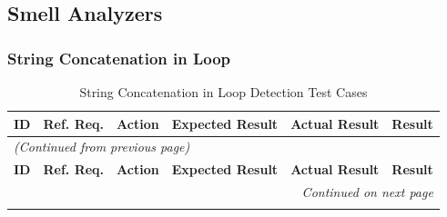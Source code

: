 \documentclass[12pt, titlepage]{article}
\begin{document}
\subsection{Smell Analyzers}

\subsubsection{String Concatenation in Loop}

\begin{longtable}{c 
  >{\raggedright\arraybackslash}p{1.5cm} 
  >{\raggedright\arraybackslash}p{4.5cm} 
  >{\raggedright\arraybackslash}p{4cm} 
  >{\raggedright\arraybackslash}p{3cm} c}
  \toprule
  \textbf{ID} & \textbf{Ref. Req.} & \textbf{Action} & \textbf{Expected Result} & \textbf{Actual Result} & \textbf{Result} \\ 
  \midrule
  \endfirsthead

  \multicolumn{6}{l}{\textit{(Continued from previous page)}} \\ 
  \toprule
  \textbf{ID} & \textbf{Ref. Req.} & \textbf{Action} & \textbf{Expected Result} & \textbf{Actual Result} & \textbf{Result} \\ 
  \midrule
  \endhead

  \multicolumn{6}{r}{\textit{Continued on next page}} \\
  \endfoot

  \bottomrule
  \caption{String Concatenation in Loop Detection Test Cases}
  \label{table:string_concat_detection_tests}
  \endlastfoot


\end{longtable}
\end{document}
